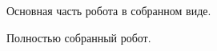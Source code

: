 \documentclass[12pt,a4paper,openany]{extarticle}
\begin{document}
\begin{figure}[h!]
	\caption{Основная часть робота в собранном виде.}
\end{figure}		

\begin{figure}[h!]
	\caption{Полностью собранный робот.}
	\label{fig:last_append_fig}
\end{figure}	
	
\end{document}
